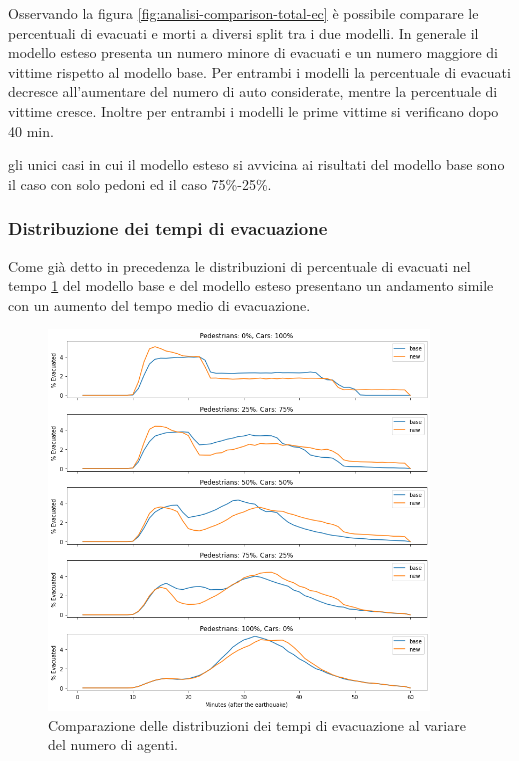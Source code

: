 Osservando la figura \ref{fig:analisi-comparison-total-ec} è possibile comparare le percentuali di evacuati e morti a diversi split tra i due modelli.
In generale il modello esteso presenta un numero minore di evacuati e un numero maggiore di vittime rispetto al modello base.
Per entrambi i modelli la percentuale di evacuati decresce all'aumentare del numero di auto considerate, mentre la percentuale di vittime cresce.
Inoltre per entrambi i modelli le prime vittime si verificano dopo 40 min.

gli unici casi in cui il modello esteso si avvicina ai risultati del modello base sono il caso con solo pedoni ed il caso 75\%-25\%.

\subsubsection*{Distribuzione dei tempi di evacuazione}

Come già detto in precedenza le distribuzioni di percentuale di evacuati nel tempo \ref{fig:analisi-comparison-evtimes} del modello base e del modello esteso 
presentano un andamento simile con un aumento del tempo medio di evacuazione.


\begin{figure}[ht]
    \centering
    \includegraphics[width=0.9\textwidth]{images/analisi/comparison-evtimes.png}
    \caption{Comparazione delle distribuzioni dei tempi di evacuazione al variare del numero di agenti.}
    \label{fig:analisi-comparison-evtimes}
\end{figure}


